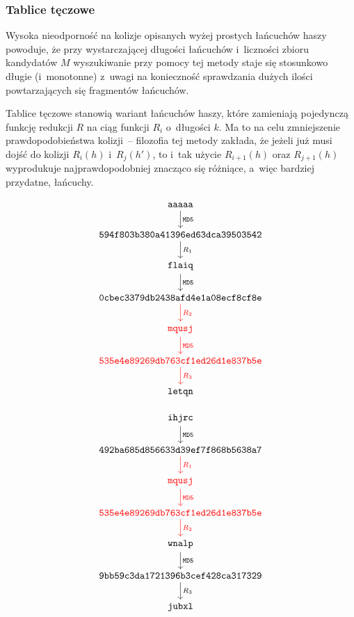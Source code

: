 \subsubsection{Tablice tęczowe}
Wysoka nieodporność na kolizje opisanych wyżej prostych łańcuchów haszy
powoduje, że przy wystarczającej długości łańcuchów i~liczności zbioru
kandydatów $M$ wyszukiwanie przy pomocy tej metody staje się stosunkowo
długie (i~monotonne) z~uwagi na konieczność sprawdzania dużych ilości
powtarzających się fragmentów łańcuchów.

Tablice tęczowe stanowią wariant łańcuchów haszy, które zamieniają pojedynczą
funkcję redukcji $R$ na ciąg funkcji $R_i$ o~długości $k$. Ma to na celu
zmniejszenie prawdopodobieństwa kolizji~-- filozofia tej metody zakłada, że
jeżeli już musi dojść do kolizji $R_i(h)$ i~$R_j(h')$, to i~tak użycie
$R_{i+1}(h)$ oraz $R_{j+1}(h)$ wyprodukuje najprawdopodobniej znacząco się
różniące, a~więc bardziej przydatne, łańcuchy.

\begin{multicols}{2}
    \[
    \begin{tikzcd}
        \mathtt{aaaaa} \arrow{d}{\mathtt{MD5}} \\
        \mathtt{594f803b380a41396ed63dca39503542} \arrow{d}{R_1} \\
        \mathtt{flaiq} \arrow{d}{\mathtt{MD5}} \\
        \mathtt{0cbec3379db2438afd4e1a08ecf8cf8e} \arrow[color=red]{d}{R_2} \\
        \mathtt{\textcolor{red}{mqusj}} \arrow[color=red]{d}{\mathtt{MD5}} \\
        \mathtt{\textcolor{red}{535e4e89269db763cf1ed26d1e837b5e}} \arrow[color=red]{d}{R_3} \\
        \mathtt{letqn}
    \end{tikzcd}
    \]

\columnbreak

    \[
    \begin{tikzcd}
        \mathtt{ihjrc} \arrow{d}{\mathtt{MD5}} \\
        \mathtt{492ba685d856633d39ef7f868b5638a7} \arrow[color=red]{d}{R_1} \\
        \mathtt{\textcolor{red}{mqusj}} \arrow[color=red]{d}{\mathtt{MD5}} \\
        \mathtt{\textcolor{red}{535e4e89269db763cf1ed26d1e837b5e}} \arrow[color=red]{d}{R_2} \\
        \mathtt{wnalp} \arrow{d}{\mathtt{MD5}} \\
        \mathtt{9bb59c3da1721396b3cef428ca317329} \arrow{d}{R_3} \\
        \mathtt{jubxl}
    \end{tikzcd}
    \]
\end{multicols}


